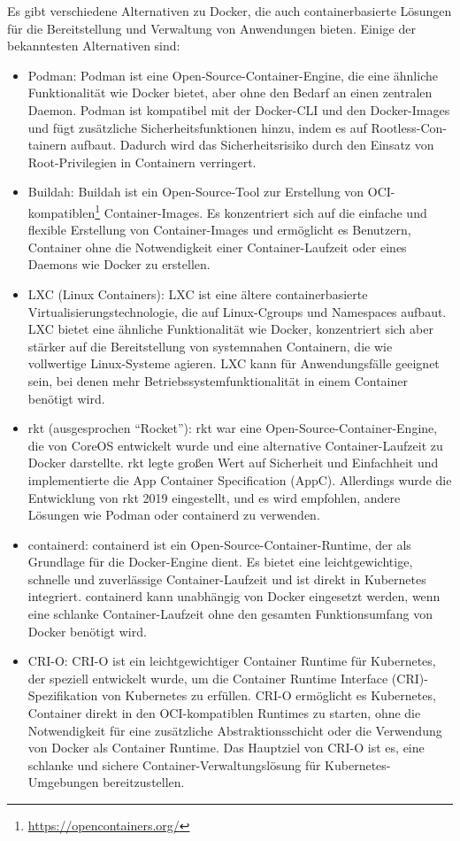 Es gibt verschiedene Alternativen zu Docker, die auch containerbasierte Lösungen für die Bereitstellung und Verwaltung von Anwendungen bieten. Einige der bekanntesten Alternativen sind:
\begin{itemize}
\item Podman: Podman ist eine Open-Source-Container-Engine, die eine ähnliche Funktionalität wie Docker bietet, aber ohne den Bedarf an einen zentralen Daemon. Podman ist kompatibel mit der Docker-CLI und den Docker-Images und fügt zusätzliche Sicherheitsfunktionen hinzu, indem es auf Rootless-Con-tainern aufbaut. Dadurch wird das Sicherheitsrisiko durch den Einsatz von Root-Privilegien in Containern verringert.
\item Buildah: Buildah ist ein Open-Source-Tool zur Erstellung von OCI-kompatiblen\footnote{\url{https://opencontainers.org/}} Container-Images. Es konzentriert sich auf die einfache und flexible Erstellung von Container-Images und ermöglicht es Benutzern, Container ohne die Notwendigkeit einer Container-Laufzeit oder eines Daemons wie Docker zu erstellen.
\item LXC (Linux Containers): LXC ist eine ältere containerbasierte Virtualisierungstechnologie, die auf Linux-Cgroups und Namespaces aufbaut. LXC bietet eine ähnliche Funktionalität wie Docker, konzentriert sich aber stärker auf die Bereitstellung von systemnahen Containern, die wie vollwertige Linux-Systeme agieren. LXC kann für Anwendungsfälle geeignet sein, bei denen mehr Betriebssystemfunktionalität in einem Container benötigt wird.
\item rkt (ausgesprochen \enquote{Rocket}): rkt war eine Open-Source-Container-Engine, die von CoreOS entwickelt wurde und eine alternative Container-Laufzeit zu Docker darstellte. rkt legte großen Wert auf Sicherheit und Einfachheit und implementierte die App Container Specification (AppC). Allerdings wurde die Entwicklung von rkt 2019 eingestellt, und es wird empfohlen, andere Lösungen wie Podman oder containerd zu verwenden.
\item containerd: containerd ist ein Open-Source-Container-Runtime, der als Grundlage für die Docker-Engine dient. Es bietet eine leichtgewichtige, schnelle und zuverlässige Container-Laufzeit und ist direkt in Kubernetes integriert. containerd kann unabhängig von Docker eingesetzt werden, wenn eine schlanke Container-Laufzeit ohne den gesamten Funktionsumfang von Docker benötigt wird.
\item CRI-O: CRI-O ist ein leichtgewichtiger Container Runtime für Kubernetes, der speziell entwickelt wurde, um die Container Runtime Interface (CRI)-Spezifikation von Kubernetes zu erfüllen. CRI-O ermöglicht es Kubernetes, Container direkt in den OCI-kompatiblen Runtimes zu starten, ohne die Notwendigkeit für eine zusätzliche Abstraktionsschicht oder die Verwendung von Docker als Container Runtime. Das Hauptziel von CRI-O ist es, eine schlanke und sichere Container-Verwaltungslösung für Kubernetes-Umgebungen bereitzustellen.
\end{itemize}  

